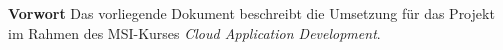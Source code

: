 \documentclass[paper,oneside,onecolumn,notitlepage,bibtotocnumbered,fontsize=12pt,bigheadings,ngerman]{scrartcl}
\newcommand{\sectionnumbering}[1]{%
  \setcounter{section}{0}%
   \renewcommand{\thesection}{\csname #1\endcsname{section}}}
\begin{document}


{\Large \textbf{Vorwort}}
\bigskip
Das vorliegende Dokument beschreibt die Umsetzung für das Projekt im Rahmen des MSI-Kurses \textit{Cloud Application Development}.


\normalsize
\setlength{\parindent}{0pt}
\newpage
\sectionnumbering{Roman} 
\tableofcontents
\clearpage
\listoffigures 
\clearpage 
\listoftables 
\clearpage
{} 
\sectionnumbering{arabic} 











\end{document}
